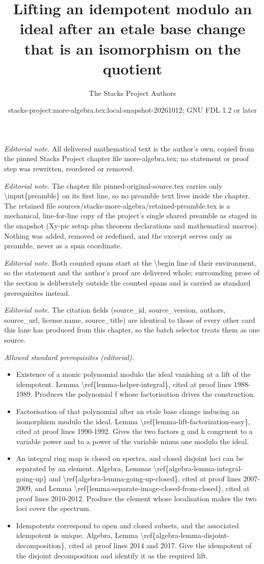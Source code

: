 \documentclass[10pt,a4paper]{amsart}
\title{Lifting an idempotent modulo an ideal after an etale base change that is an isomorphism on the quotient}
\author{The Stacks Project Authors}
\date{stacks-project:more-algebra.tex:local-snapshot-20261012; GNU FDL 1.2 or later}
\theoremstyle{plain}
\theoremstyle{definition}
\theoremstyle{remark}
\numberwithin{equation}{subsection}
\begin{document}
\maketitle
\setcounter{subsection}{1}
\noindent\textit{Editorial note.} All delivered mathematical text is the author's own, copied from the pinned Stacks Project chapter file more-algebra.tex; no statement or proof step was rewritten, reordered or removed.\par\medskip
\noindent\textit{Editorial note.} The chapter file pinned-original-source.tex carries only \textbackslash{}input\{preamble\} on its first line, so no preamble text lives inside the chapter. The retained file sources/stacks-more-algebra/retained-preamble.tex is a mechanical, line-for-line copy of the project's single shared preamble as staged in the snapshot (Xy-pic setup plus theorem declarations and mathematical macros). Nothing was added, removed or redefined, and the excerpt serves only as preamble, never as a span coordinate.\par\medskip
\noindent\textit{Editorial note.} Both counted spans start at the \textbackslash{}begin line of their environment, so the statement and the author's proof are delivered whole; surrounding prose of the section is deliberately outside the counted spans and is carried as standard prerequisites instead.\par\medskip
\noindent\textit{Editorial note.} The citation fields (source\_id, source\_version, authors, source\_url, license.name, source\_title) are identical to those of every other card this lane has produced from this chapter, so the batch selector treats them as one source.\par\medskip
\noindent\textit{Allowed standard prerequisites (editorial).}\begin{itemize}
\item Existence of a monic polynomial modulo the ideal vanishing at a lift of the idempotent. Lemma \textbackslash{}ref\{lemma-helper-integral\}, cited at proof lines 1988-1989. Produces the polynomial f whose factorisation drives the construction.
\item Factorisation of that polynomial after an etale base change inducing an isomorphism modulo the ideal. Lemma \textbackslash{}ref\{lemma-lift-factorization-easy\}, cited at proof lines 1990-1992. Gives the two factors g and h congruent to a variable power and to a power of the variable minus one modulo the ideal.
\item An integral ring map is closed on spectra, and closed disjoint loci can be separated by an element. Algebra, Lemmas \textbackslash{}ref\{algebra-lemma-integral-going-up\} and \textbackslash{}ref\{algebra-lemma-going-up-closed\}, cited at proof lines 2007-2009, and Lemma \textbackslash{}ref\{lemma-separate-image-closed-from-closed\}, cited at proof lines 2010-2012. Produce the element whose localisation makes the two loci cover the spectrum.
\item Idempotents correspond to open and closed subsets, and the associated idempotent is unique. Algebra, Lemma \textbackslash{}ref\{algebra-lemma-disjoint-decomposition\}, cited at proof lines 2014 and 2017. Give the idempotent of the disjoint decomposition and identify it as the required lift.
\end{itemize}\medskip
\end{document}

